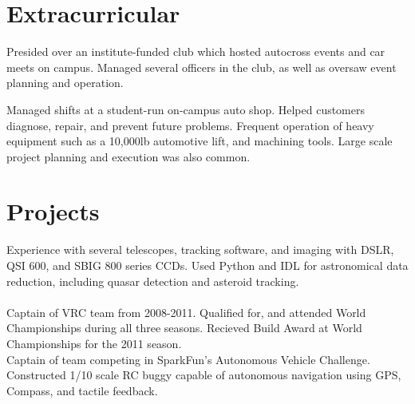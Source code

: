 \documentclass[letterpaper]{deedy-resume} %
\begin{document}
\begin{minipage}[t]{0.66\textwidth}

\section{Extracurricular} 


Presided over an institute-funded club which hosted autocross events and car meets
on campus. Managed several officers in the club, as well as oversaw event planning
and operation.
\vspace{3pt}\\


Managed shifts at a student-run on-campus auto shop. Helped customers diagnose,
repair, and prevent future problems. Frequent operation of heavy equipment such as a
10,000lb automotive lift, and machining tools. Large scale project
planning and execution was also common.



\section{Projects}
Experience with several telescopes, tracking software, and imaging with DSLR, QSI 600, and SBIG 800 series CCDs. Used Python and IDL for astronomical data reduction, including quasar detection and asteroid tracking.\vspace{5pt}\\
~\\
 Captain of VRC team from 2008-2011. Qualified for, and attended World Championships during all three seasons. Recieved Build Award at World Championships for the 2011 season.\\
Captain of team competing in SparkFun’s Autonomous Vehicle Challenge. Constructed 1/10 scale RC buggy capable of autonomous navigation using GPS, Compass, and tactile feedback.\vspace{5pt}\\


\end{minipage}
\end{document}
